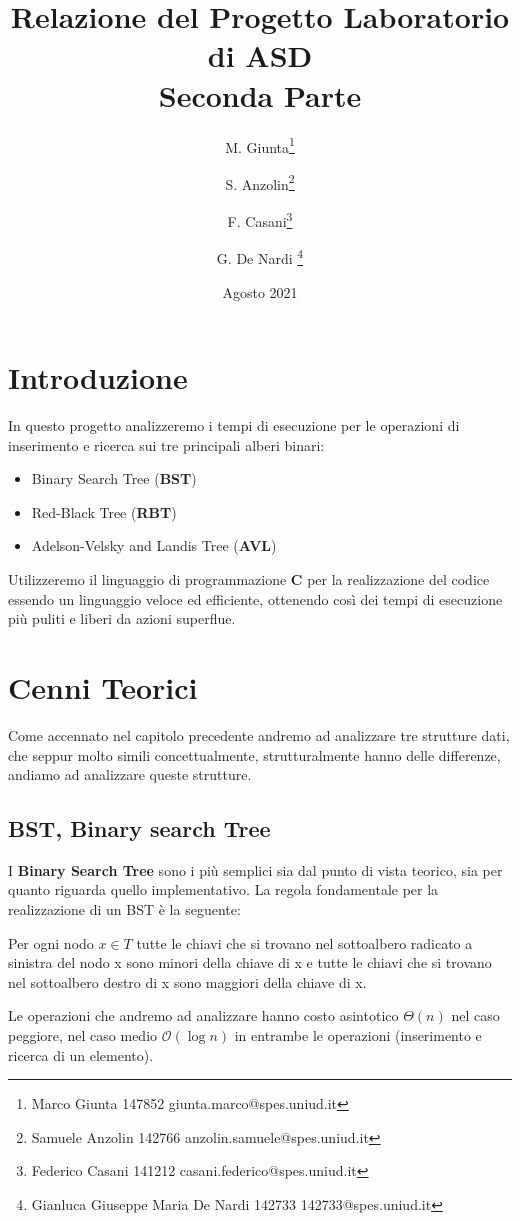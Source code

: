 \documentclass[a4paper,titlepage]{article}
\title{Relazione del Progetto Laboratorio di ASD\\[0.5em]
\large Seconda Parte}
\date{Agosto 2021}
\author{
M. Giunta\thanks{Marco Giunta 147852 giunta.marco@spes.uniud.it} \and
S. Anzolin\thanks{Samuele Anzolin 142766  anzolin.samuele@spes.uniud.it} \and
F. Casani\thanks{Federico Casani 141212  casani.federico@spes.uniud.it} \and
G. De Nardi \thanks{Gianluca Giuseppe Maria De Nardi 142733 142733@spes.uniud.it}
}
\begin{document}
\maketitle

\tableofcontents
\newpage

\section{Introduzione}
In questo progetto analizzeremo i tempi di esecuzione per le operazioni di inserimento e ricerca sui tre principali alberi binari:
\begin{itemize}
  \item Binary Search Tree (\textbf{BST})
  \item Red-Black Tree (\textbf{RBT})
  \item Adelson-Velsky and Landis Tree (\textbf{AVL})
\end{itemize}
Utilizzeremo il linguaggio di programmazione \textbf{C} per la realizzazione del codice essendo un linguaggio veloce ed efficiente, ottenendo così dei tempi di esecuzione più puliti e liberi da azioni superflue.
\newpage

\section{Cenni Teorici}
Come accennato nel capitolo precedente andremo ad analizzare tre strutture dati, che seppur molto simili concettualmente, strutturalmente hanno delle differenze, andiamo ad analizzare queste strutture.

\subsection{BST, Binary search Tree}
I \textbf{Binary Search Tree} sono i più semplici sia dal punto di vista teorico, sia per quanto riguarda quello implementativo.
La regola fondamentale per la realizzazione di un BST è la seguente:

\begin{displayquote}
Per ogni nodo \(x \in T\) tutte le chiavi che si trovano nel sottoalbero radicato a sinistra del nodo x sono minori della chiave di x e tutte le chiavi che si trovano nel sottoalbero destro di x sono maggiori della chiave di x.
\end{displayquote}

Le operazioni che andremo ad analizzare hanno costo asintotico \(\Theta(n)\) nel caso peggiore,  nel caso medio \(\mathcal{O}(\log{}n)\) in entrambe le operazioni (inserimento e ricerca di un elemento).
\end{document}
